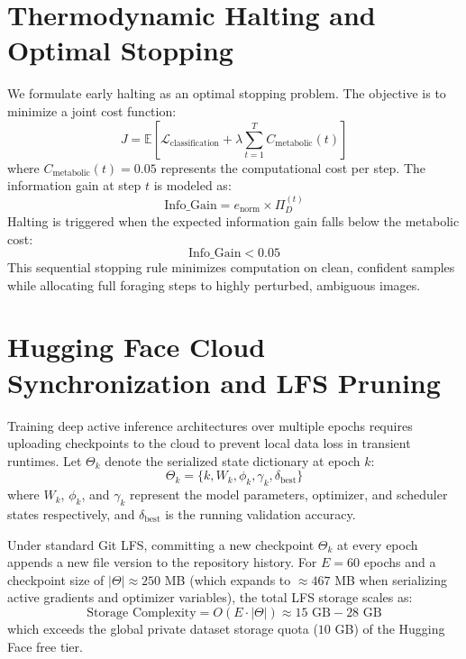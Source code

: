 \section{Thermodynamic Halting and Optimal Stopping}
We formulate early halting as an optimal stopping problem. The objective is to minimize a joint cost function:
\begin{equation}
J = \mathbb{E} \left[ \mathcal{L}_{\text{classification}} + \lambda \sum_{t=1}^T C_{\text{metabolic}}(t) \right]
\end{equation}
where $C_{\text{metabolic}}(t) = 0.05$ represents the computational cost per step. The information gain at step $t$ is modeled as:
\begin{equation}
\text{Info\_Gain} = e_{\text{norm}} \times \Pi_D^{(t)}
\end{equation}
Halting is triggered when the expected information gain falls below the metabolic cost:
\begin{equation}
\text{Info\_Gain} < 0.05
\end{equation}
This sequential stopping rule minimizes computation on clean, confident samples while allocating full foraging steps to highly perturbed, ambiguous images.

\section{Hugging Face Cloud Synchronization and LFS Pruning}
Training deep active inference architectures over multiple epochs requires uploading checkpoints to the cloud to prevent local data loss in transient runtimes. Let $\Theta_k$ denote the serialized state dictionary at epoch $k$:
\begin{equation}
\Theta_k = \{k, W_k, \phi_k, \gamma_k, \delta_{\text{best}}\}
\end{equation}
where $W_k$, $\phi_k$, and $\gamma_k$ represent the model parameters, optimizer, and scheduler states respectively, and $\delta_{\text{best}}$ is the running validation accuracy.

Under standard Git LFS, committing a new checkpoint $\Theta_k$ at every epoch appends a new file version to the repository history. For $E = 60$ epochs and a checkpoint size of $|\Theta| \approx 250$ MB (which expands to $\approx 467$ MB when serializing active gradients and optimizer variables), the total LFS storage scales as:
\begin{equation}
\text{Storage Complexity} = O(E \cdot |\Theta|) \approx 15 \text{ GB} - 28 \text{ GB}
\end{equation}
which exceeds the global private dataset storage quota ($10$ GB) of the Hugging Face free tier.

